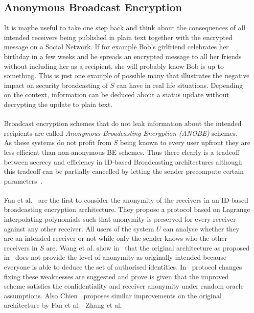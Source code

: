 \documentclass[journal]{IEEEtran}
\begin{document}
\subsection{Anonymous Broadcast Encryption}
It is maybe useful to take one step back and think about the consequences of
all intended receivers being published in plain text together with the encrypted
message on a Social Network. If for example Bob's girlfriend celebrates her
birthday in a few weeks and he spreads an encrypted message to all her friends
without including her as a recipient, she will probably know Bob is up to
something. This is just one example of possible many that illustrates the
negative impact on security broadcasting of $S$ can have in real life
situations. Depending on the context, information can be deduced about a
status update without decrypting the update to plain text.\\
\\
Broadcast encryption schemes that do not leak information about the intended
recipients are called \textit{Anonymous Broadcasting Encryption (ANOBE)}
schemes.~\cite{LibertANOBE} As these systems do not profit from $S$ being known
to every user upfront they are less efficient than non-anonymous BE
schemes. Thus there clearly is a tradeoff between secrecy and efficiency in
ID-based Broadcasting architectures although this tradeoff can be
partially cancelled by letting the sender precompute certain
parameters~\cite{FanANOMIBE}.\\
\\
Fan et al.~\cite{FanANOMIBE} are the first to consider the anonymity of the
receivers in an ID-based broadcasting encryption architecture. They propose a
protocol based on Lagrange interpolating polynomials such that anonymity is
preserved for every receiver against any other receiver. All users of the
system $U$ can analyse whether they are an intended receiver or not while only
the sender knows who the other receivers in $S$ are. Wang et al. show
in~\cite{WangCryptanalysis} that the original architecture as proposed
in~\cite{FanANOMIBE} does not provide the level of anonymity as originally
intended because everyone is able to deduce the set of authorised identities.
In~\cite{WangCryptanalysis} protocol changes fixing these weaknesses are
suggested and prove is given that the improved scheme satisfies the
confidentiality and receiver anonymity under random oracle assumptions. Also
Chien~\cite{ChienImproved} proposes similar improvements on the original
architecture by Fan et al.~\cite{FanANOMIBE} Zhang et al.~\cite{ZhangComment}
\end{document}
